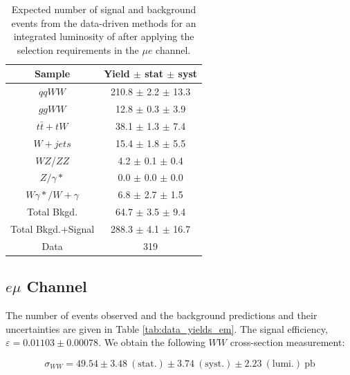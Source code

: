 \begin{table}[ht!]
  \begin{center}
  \begin{tabular} {|c|c|}
\hline
Sample                & Yield $\pm$ stat $\pm$ syst \\ \hline \hline
$qqWW$                & 210.8 $\pm$  2.2 $\pm$ 13.3  \\ \hline
$ggWW$                & 12.8 $\pm$  0.3 $\pm$  3.9  \\ \hline
$t\bar{t} + tW$      & 38.1 $\pm$  1.3 $\pm$  7.4  \\ \hline
$W+jets$              & 15.4 $\pm$  1.8 $\pm$  5.5  \\ \hline
$WZ$/$ZZ$             &  4.2 $\pm$  0.1 $\pm$  0.4  \\ \hline
$Z/\gamma*$          &  0.0 $\pm$  0.0 $\pm$  0.0  \\ \hline
$W\gamma*/W+\gamma$ &  6.8 $\pm$  2.7 $\pm$  1.5  \\ \hline \hline
Total Bkgd.           & 64.7 $\pm$  3.5 $\pm$  9.4  \\ \hline \hline
Total Bkgd.+Signal    & 288.3 $\pm$  4.1 $\pm$ 16.7  \\ \hline \hline
Data                  & 319 \\ \hline
\end{tabular}
  \caption{Expected number of signal and background events from the data-driven methods for
  an integrated luminosity of \intlumi after applying the selection requirements in the $\mu e$ channel.}
   \label{tab:data_yields_me}
  \end{center}
\end{table}

%
%
%
\subsection{$e \mu$ Channel}

The number of events observed and the background predictions and their uncertainties are
given in Table \ref{tab:data_yields_em}.
The signal efficiency,  $\varepsilon = 0.01103 \pm 0.00078$.
We obtain the following $WW$ cross-section measurement:

\begin{equation*}
\sigma_{WW}  = 49.54 \pm 3.48~\mathrm{(stat.)} \pm 3.74~\mathrm{(syst.)} \pm 2.23~\mathrm{(lumi.)~pb} 
\end{equation*}

